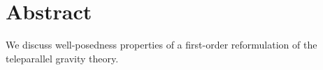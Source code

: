 \documentclass[
10pt, %
a4paper, %
oneside, %
headinclude,footinclude, %
BCOR5mm, %
]{scrartcl}
\title{\large\normalfont\spacedallcaps{Computational aspects of teleparallel gravity}} %
\author{\normalsize\textsc{Ilya Peshkov}$^1$ \& 
\normalsize\textsc{Evgeniy Romenski}$^{2,3}$ \&
\normalsize\textsc{Michael Dumbser}$^{4}$ \ldots
} %
\date{\small\today} %
\begin{document}

\renewcommand{\sectionmark}[1]{\markright{\spacedlowsmallcaps{#1}}} %
\lehead{\mbox{\llap{\small\thepage\kern1em\color{halfgray} 
\vline}\color{halfgray}\hspace{0.5em}\rightmark\hfil}} %

\pagestyle{scrheadings} %


\maketitle %

\setcounter{tocdepth}{2} %

\tableofcontents %




\section*{Abstract} %
We discuss well-posedness properties of a first-order reformulation of the teleparallel gravity
theory.
\end{document}
